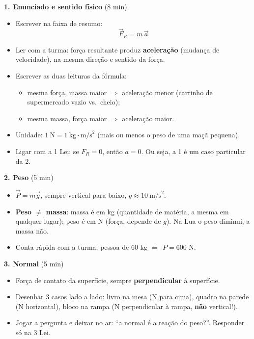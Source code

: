 \documentclass[11pt,a4paper]{article}
\begin{document}
\begin{quadro}
\textbf{1. Enunciado e sentido f\'isico} (8 min)
\begin{itemize}[nosep]
  \item Escrever na faixa de resumo:
  \[
    \boxed{\vec{F}_R = m\,\vec{a}}
  \]
  \item Ler com a turma: for\c{c}a resultante produz
        \textbf{acelera\c{c}\~ao} (mudan\c{c}a de velocidade), na mesma
        dire\c{c}\~ao e sentido da for\c{c}a.
  \item Escrever as duas leituras da f\'ormula:
    \begin{itemize}[nosep]
      \item mesma for\c{c}a, massa maior $\Rightarrow$
            acelera\c{c}\~ao menor (carrinho de supermercado vazio
            vs.\ cheio);
      \item mesma massa, for\c{c}a maior $\Rightarrow$
            acelera\c{c}\~ao maior.
    \end{itemize}
  \item Unidade: $1\ \text{N} = 1\ \text{kg}\cdot\text{m/s}^2$
        (mais ou menos o peso de uma ma\c{c}\~a pequena).
  \item Ligar com a 1\textordfeminine{} Lei: se $F_R = 0$, ent\~ao
        $a = 0$. Ou seja, a 1\textordfeminine{} \'e um caso particular
        da 2\textordfeminine{}.
\end{itemize}

\medskip
\textbf{2. Peso} (5 min)
\begin{itemize}[nosep]
  \item $\vec{P} = m\vec{g}$, sempre vertical para baixo,
        $g \approx 10\ \text{m/s}^2$.
  \item \textbf{Peso $\neq$ massa}: massa \'e em kg (quantidade de
        mat\'eria, a mesma em qualquer lugar); peso \'e em N (for\c{c}a,
        depende de $g$). Na Lua o peso diminui, a massa n\~ao.
  \item Conta r\'apida com a turma: pessoa de 60 kg $\Rightarrow$
        $P = 600$ N.
\end{itemize}

\medskip
\textbf{3. Normal} (5 min)
\begin{itemize}[nosep]
  \item For\c{c}a de contato da superf\'icie, sempre
        \textbf{perpendicular} \`a superf\'icie.
  \item Desenhar 3 casos lado a lado: livro na mesa (N para cima),
        quadro na parede (N horizontal), bloco na rampa
        (N perpendicular \`a rampa, \textbf{n\~ao} vertical!).
  \item Jogar a pergunta e deixar no ar: ``a normal \'e a rea\c{c}\~ao
        do peso?''. Responder s\'o na 3\textordfeminine{} Lei.
\end{itemize}


\end{quadro}
\end{document}
